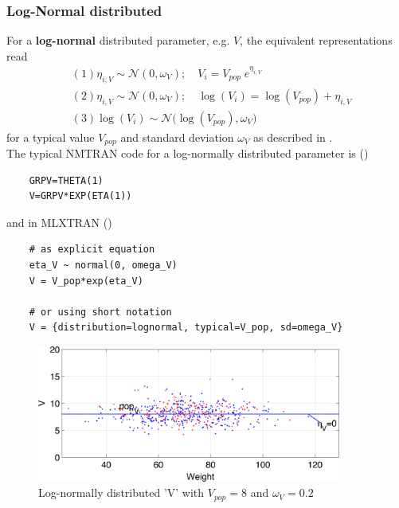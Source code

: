 \subsubsection{Log-Normal distributed}
For a \textbf{log-normal} distributed parameter, e.g. $V$, the equivalent representations read
\begin{align*}
&(1) \eta_{i,V} \sim \mathcal{N}(0,\omega_V); \quad V_i= V_{pop} \; e^{\eta_{i,V}}   \\
&(2) \eta_{i,V} \sim \mathcal{N}(0,\omega_V); \quad \log( V_i ) = \log( V_{pop} ) + \eta_{i,V}  \\
&(3) \log( V_i ) \sim \mathcal{N}\big( \log( V_{pop} ),\omega_V\big)
\end{align*}
for a typical value $V_{pop}$ and standard deviation $\omega_V$ as described in \cite{LavielleBook:2014}.\\
The typical NMTRAN code for a log-normally distributed parameter is (\cite{Smith:2012aa})
\begin{lstlisting}
	GRPV=THETA(1)
	V=GRPV*EXP(ETA(1))
\end{lstlisting}
and in MLXTRAN (\cite{MonolixOverview:2012})
\begin{lstlisting}
	# as explicit equation
	eta_V ~ normal(0, omega_V)
	V = V_pop*exp(eta_V)

	# or using short notation
	V = {distribution=lognormal, typical=V_pop, sd=omega_V}
\end{lstlisting}

\begin{figure}[htbp]
\centering
 \includegraphics[width=100mm]{pics/paramCovModel_V}
\caption{Log-normally distributed 'V' with $V_{pop}=8$ and $\omega_V=0.2$}
\label{fig:parameterCovModel0}
\end{figure}



